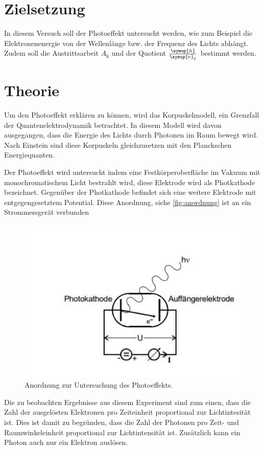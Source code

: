 \section{Zielsetzung}
In diesem Versuch soll der Photoeffekt untersucht werden, wie zum Beispiel die Elektronenenergie von der Wellenlänge bzw. der Frequenz des Lichts abhängt.
Zudem soll die Austrittsarbeit $A_\text{k}$ und der Quotient $\frac{\symup{h}}{\symup{e}_0}$ bestimmt werden.

\section{Theorie}
\label{sec:Theorie}
Um den Photoeffekt erklären zu können, wird das Korpuskelmodell, ein Grenzfall der Quantenelektrodynamik betrachtet.
In diesem Modell wird davon ausgegangen, dass die Energie des Lichts durch Photonen im Raum bewegt wird.
Nach Einstein sind diese Korpuskeln gleichzusetzen mit den Planckschen Energiequanten.

\noindent
Der Photoeffekt wird untersucht indem eine Festkörperoberfläche im Vakuum mit monochromatischem Licht bestrahlt wird, diese Elektrode wird als Photkathode bezeichnet.
Gegenüber der Photkathode befindet sich eine weitere Elektrode mit entgegengesetztem Potential.
Diese Anordnung, siehe \autoref{fig:anordnung} ist an ein Strommessgerät verbunden

\begin{figure}
    \centering
    \includegraphics[width =\textwidth]{content/anordnung.pdf}
    \caption{Anordnung zur Untersuchung des Photoeffekts.\cite{anleitung}}
    \label{fig:anordnung}
\end{figure}
\noindent
Die zu beobachten Ergebnisse aus diesem Experiment sind zum einen, dass die Zahl der ausgelösten Elektronen pro Zeiteinheit proportional zur Lichtintesität ist.
Dies ist damit zu begründen, dass die Zahl der Photonen pro Zeit- und Raumwinkeleinheit proportional zur Lichtintensität ist.
Zusätzlich kann ein Photon auch nur ein Elektron auslösen.

